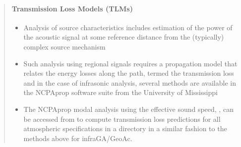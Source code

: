 \documentclass[letterpaper,10pt,english]{sphinxmanual}
\begin{document}
\begin{itemize}
\begin{quote}
\begin{itemize}
\end{itemize}

\begin{sphinxVerbatim}[commandchars=\\\{\}]
   

  
    
\end{sphinxVerbatim}


\paragraph{Transmission Loss Models (TLMs)}
\label{\detokenize{propagation:transmission-loss-models-tlms}}\begin{itemize}
\item {} 
Analysis of source characteristics includes estimation of the power of the acoustic signal at some reference distance from the (typically) complex source mechanism

\item {} 
Such analysis using regional signals requires a propagation model that relates the energy losses along the path, termed the transmission loss and in the case of infrasonic analysis, several methods are available in the NCPAprop software suite from the University of Mississippi

\item {} 
The NCPAprop modal analysis using the effective sound speed, , can be accessed from  to compute transmission loss predictions for all atmospheric specifications in a directory in a similar fashion to the methods above for infraGA/GeoAc.

\end{itemize}

\begin{sphinxVerbatim}[commandchars=\\\{\}]
   

      
    


\end{sphinxVerbatim}
\end{quote}
\end{itemize}
\end{document}
